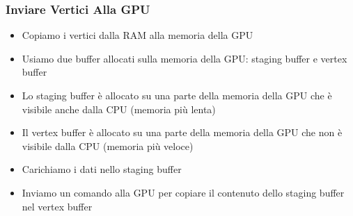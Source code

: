 \begin{frame}
\frametitle{Inviare Vertici Alla GPU}

\begin{itemize}
\item Copiamo i vertici dalla RAM alla memoria della GPU
\item Usiamo due buffer allocati sulla memoria della GPU: staging buffer e vertex buffer
\item Lo staging buffer è allocato su una parte della memoria della GPU che è visibile anche dalla CPU (memoria più lenta)
\item Il vertex buffer è allocato su una parte della memoria della GPU che non è visibile dalla CPU (memoria più veloce)
\item Carichiamo i dati nello staging buffer
\item Inviamo un comando alla GPU per copiare il contenuto dello staging buffer nel vertex buffer
\end{itemize}

\end{frame}

